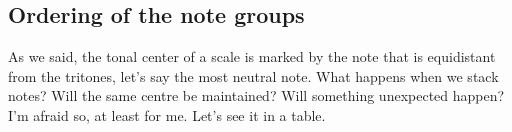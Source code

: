 \documentclass[]{report}
\begin{document}
\subsection{Ordering of the note groups}
As we said, the tonal center of a scale is marked by the note that is equidistant from the tritones, let's say the most neutral note. What happens when we stack notes? Will the same centre be maintained? Will something unexpected happen? I'm afraid so, at least for me.
Let's see it in a table.
\begin{table}[H]
  \centering
  \caption{Particles  of 1 note}\label{tab:particles-one-note-white}
\end{table}
\vspace{-2em} %
\begin{table}[H]
  \centering
  \caption{Particles  of 2 notes}\label{tab:particles-two-notes-white}
\end{table}

\vspace{-2em} %
\begin{table}[H]
  \centering
  \caption{Particles  of 3 notes}\label{tab:particles-three-notes-white}
\end{table}
\vspace{-2em} %
\end{document}
